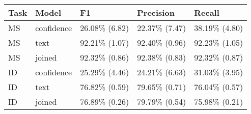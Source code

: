 \begin{tabular}{lllll}
\toprule
Task &       Model &             F1 &      Precision &         Recall \\
\midrule
  MS &  confidence &  26.08\% (6.82) &  22.37\% (7.47) &  38.19\% (4.80) \\
  MS &        text &  92.21\% (1.07) &  92.40\% (0.96) &  92.23\% (1.05) \\
  MS &      joined &  92.32\% (0.86) &  92.38\% (0.83) &  92.32\% (0.87) \\
  ID &  confidence &  25.29\% (4.46) &  24.21\% (6.63) &  31.03\% (3.95) \\
  ID &        text &  76.82\% (0.59) &  79.65\% (0.71) &  76.04\% (0.57) \\
  ID &      joined &  76.89\% (0.26) &  79.79\% (0.54) &  75.98\% (0.21) \\
\bottomrule
\end{tabular}
